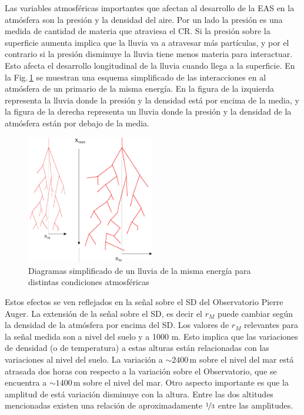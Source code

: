 Las variables atmosféricas importantes que afectan al desarrollo de la EAS en la atmósfera son la presión y la densidad del aire. Por un lado la presión es una medida de cantidad de materia que atraviesa el CR. Si la presión sobre la superficie aumenta implica que la lluvia va a atravesar más partículas, y por el contrario si la presión disminuye la lluvia tiene menos materia para interactuar. Esto afecta el desarrollo longitudinal de la lluvia cuando llega a la superficie. En la Fig.\,\ref{fig:eas} se muestran una esquema simplificado de las interacciones en al atmósfera de un primario de la misma energía. En la figura de la izquierda representa la lluvia donde la presión y la densidad está por encima de la media, y la figura de la derecha representa un lluvia donde la presión y la densidad de la atmósfera están por debajo de la media.

\begin{figure}[H]
	\centering
	\includegraphics[width=0.5\textwidth]{eas.png}
	\caption{Diagramas simplificado de un lluvia de la misma energía para distintas condiciones atmosféricas}
	\label{fig:eas}
\end{figure}

Estos efectos se ven reflejados en la señal sobre el SD del Observatorio Pierre Auger. La extensión de la señal sobre el SD, es decir el $r_M$ puede cambiar según la densidad de la atmósfera por encima del SD. Los valores de $r_M$ relevantes para la señal medida son a nivel del suelo y a 1000 m. Esto implica que las variaciones de densidad (o de temperatura) a estas alturas están relacionadas con las variaciones al nivel del suelo. La variación a $\sim2400\,$m sobre el nivel del mar está atrasada dos horas con respecto a la variación sobre el Observatorio, que se encuentra a $\sim1400\,$m sobre el nivel del mar. Otro aspecto importante es que la amplitud de está variación disminuye con la altura. Entre las dos altitudes mencionadas existen una relación de aproximadamente $\nicefrac{1}{3}$ entre las amplitudes. 


